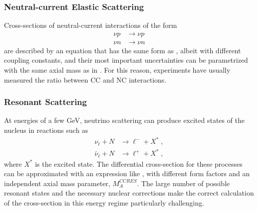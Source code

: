 \subsubsection{Neutral-current Elastic Scattering}
Cross-sections of neutral-current interactions of the form
\begin{equation}
\begin{aligned}
    \nu p &\rightarrow \nu p \\
    \nu n &\rightarrow \nu n
\end{aligned}
\end{equation}
are described by an equation that has the same form as , albeit with different coupling constants, and their most important uncertainties can be parametrized with the same axial mass as in . For this reason, experiments have usually measured the ratio between CC and NC interactions.

\subsubsection{Resonant Scattering}
At energies of a few GeV, neutrino scattering can produce excited states of the nucleus in reactions such as
\begin{equation}
\begin{aligned}
    \nu_\ell + N &\rightarrow \ell^- + X^*\;, \\
    \bar{\nu}_\ell + N &\rightarrow \ell^+  + X^*\;,
\end{aligned}
\end{equation}
where $X^*$ is the excited state. The differential cross-section for these processes can be approximated with an expression like , with different form factors and an independent axial mass parameter, $M_A^{CCRES}$. The large number of possible resonant states and the necessary nuclear corrections make the correct calculation of the cross-section in this energy regime particularly challenging.

